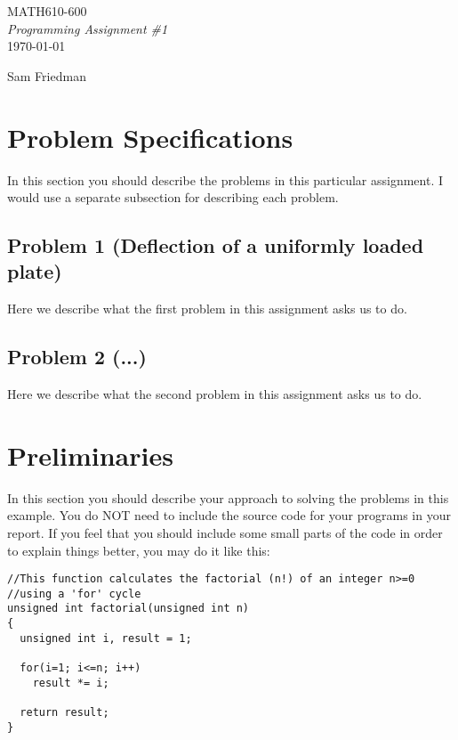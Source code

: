 \documentclass[11pt]{article}
\begin{document}
\begin{titlepage}

\vspace*{55mm}
\begin{center}
{\huge MATH610-600}\\[1cm]
{\em \huge Programming Assignment \#1}\\[70mm]
{\large \today} \\[15mm]
\end{center}

\begin{flushright}
{\LARGE Sam Friedman}
\end{flushright}

\vfill

\end{titlepage}

\newpage
\section{Problem Specifications}
In this section you should describe the problems in this particular assignment.
I would use a separate subsection for describing each problem.
\subsection{Problem 1 (Deflection of a uniformly loaded plate)}
Here we describe what the first problem in this assignment asks us to do.
\subsection{Problem 2 (...)}
Here we describe what the second problem in this assignment asks us to do.

\section{Preliminaries}
In this section you should describe your approach to solving the problems
in this example. You do NOT need to include the source code for your 
programs in your report. If you feel that you should include some small
parts of the code in order to explain things better, you may do it like
this:
\begin{verbatim}
//This function calculates the factorial (n!) of an integer n>=0
//using a 'for' cycle
unsigned int factorial(unsigned int n)
{
  unsigned int i, result = 1;
  
  for(i=1; i<=n; i++)
    result *= i;

  return result;
}
\end{verbatim}
\end{document}
